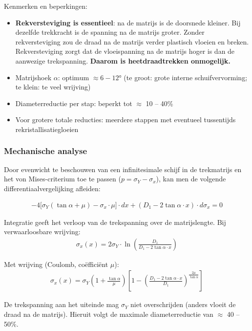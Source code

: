 Kenmerken en beperkingen:
\begin{itemize}
    \item \textbf{Rekversteviging is essentieel}: na de matrijs is de doorsnede kleiner. Bij dezelfde trekkracht is de spanning na de matrijs groter. Zonder rekversteviging zou de draad na de matrijs verder plastisch vloeien en breken. Rekversteviging zorgt dat de vloeispanning na de matrijs hoger is dan de aanwezige trekspanning. \textbf{Daarom is heetdraadtrekken onmogelijk.}
    \item Matrijshoek $\alpha$: optimum $\approx 6 - 12$° (te groot: grote interne schuifvervorming; te klein: te veel wrijving)
    \item Diameterreductie per stap: beperkt tot $\approx$ 10 -- 40\%
    \item Voor grotere totale reducties: meerdere stappen met eventueel tussentijds rekristallisatiegloeien
\end{itemize}

\subsubsection{Mechanische analyse}

Door evenwicht te beschouwen van een infinitesimale schijf in de trekmatrijs en het von Mises-criterium toe te passen ($p = \sigma_Y - \sigma_x$), kan men de volgende differentiaalvergelijking afleiden:

\begin{align*}
    -4\bigl[\sigma_Y(\tan\alpha + \mu) - \sigma_x \cdot \mu\bigr]\cdot dx + (D_1 - 2\tan\alpha \cdot x)\cdot d\sigma_x = 0
\end{align*}

Integratie geeft het verloop van de trekspanning over de matrijslengte. Bij verwaarloosbare wrijving:
\begin{align*}
    \sigma_x(x) = 2\sigma_Y \cdot \ln\!\left(\frac{D_1}{D_1 - 2\tan\alpha \cdot x}\right)
\end{align*}

Met wrijving (Coulomb, coëfficiënt $\mu$):
\begin{align*}
    \sigma_x(x) = \sigma_Y\!\left(1 + \frac{\tan\alpha}{\mu}\right)\!\left[1 - \left(\frac{D_1 - 2\tan\alpha \cdot x}{D_1}\right)^{\!\frac{2\mu}{\tan\alpha}}\right]
\end{align*}

De trekspanning aan het uiteinde mag $\sigma_Y$ niet overschrijden (anders vloeit de draad na de matrijs). Hieruit volgt de maximale diameterreductie van $\approx$ 40 -- 50\%.

